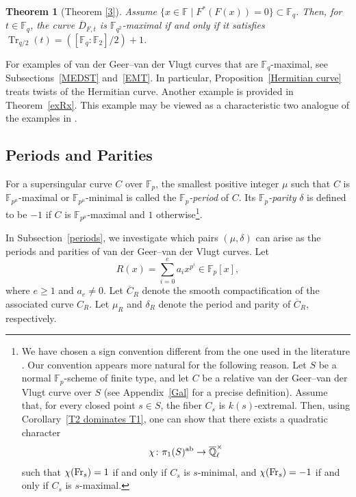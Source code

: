 \documentclass[12pt,a4paper]{amsart}
\newtheorem{theorem}{Theorem}[section]
\theoremstyle{definition}
\def\F{{\mathbb F}}
\def\Ql{\overline{\mathbb{Q}}_\ell}
\theoremstyle{remark}
\DeclareMathOperator{\Tr}{Tr}
\begin{document}
\begin{theorem}[Theorem \ref{3}]
Assume $\{x \in \F \mid F^\ast(F(x))=0\} \subset \F_q$. Then, for $t \in \F_q$, the curve $\overline{D}_{F, t}$ is $\F_{q^2}$-maximal if and only if it satisfies $\Tr_{q/2}(t)={([\F_q:\F_2]/2)+1}$. 
\end{theorem}

For examples of van der Geer--van der Vlugt curves that are $\F_q$-maximal, see Subsections~\ref{MEDST} and~\ref{EMT}. In particular, Proposition~\ref{Hermitian curve} treats twists of the Hermitian curve. Another example is provided in Theorem~\ref{exRx}. This example may be viewed as a characteristic two analogue of the examples in \cite[Theorem 1.1]{ITT}.

\subsection{Periods and Parities}\label{Periods and Parities}

For a supersingular curve $C$ over $\F_p$, the smallest positive integer $\mu$ such that $C$ is $\F_{p^\mu}$-maximal or $\F_{p^\mu}$-minimal is called the \textit{$\F_p$-period} of $C$. Its \emph{$\F_p$-parity} $\delta$ is defined to be $-1$ if $C$ is $\F_{p^\mu}$-maximal and $1$ otherwise\footnote{We have chosen a sign convention different from the one used in the literature \cite{KP,SX}. Our convention appears more natural for the following reason. Let $S$ be a normal $\F_p$-scheme of finite type, and let $C$ be a relative van der Geer--van der Vlugt curve over $S$ (see Appendix~\ref{Gal} for a precise definition). 
Assume that, for every closed point $s\in S$, the fiber $C_s$ is $k(s)$-extremal. Then, using Corollary~\ref{T2 dominates T1}, one can show that there exists a quadratic character 
\[
\chi\colon \pi_1(S)^{\rm ab}\to \Ql^\times
\]
such that $\chi({\rm Fr}_s)=1$ if and only if $C_s$ is $s$-minimal, and $\chi({\rm Fr}_s)=-1$ if and only if $C_s$ is $s$-maximal. }. 


In Subsection~\ref{periods}, we investigate which pairs $(\mu,\delta)$ can arise as the periods and parities of van der Geer--van der Vlugt curves.  Let 
\[R(x)=\sum_{i=0}^ea_ix^{p^i}\in \F_p[x],\]
where $e\geq1$ and $a_e\neq0$. Let $\overline{C}_R$ denote the smooth compactification of the associated curve $C_R$. 
Let $\mu_R$ and $\delta_R$ denote the period and parity of $\overline{C}_R$, respectively. 
\end{document}

